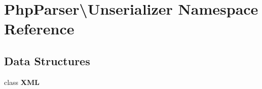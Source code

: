 \section{Php\+Parser\textbackslash{}Unserializer Namespace Reference}
\label{namespace_php_parser_1_1_unserializer}
\subsection*{Data Structures}
\begin{DoxyCompactItemize}
\item 
class {\bf X\+M\+L}
\end{DoxyCompactItemize}
